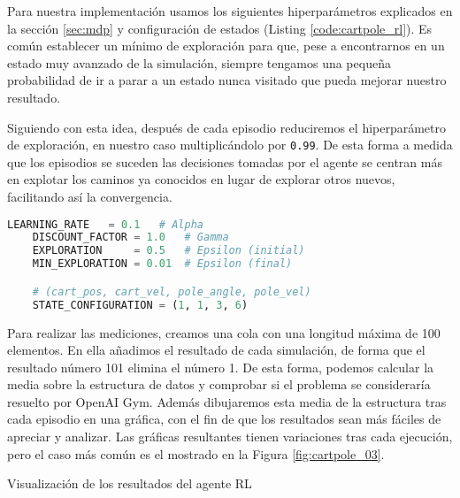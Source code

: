 Para nuestra implementación usamos los siguientes hiperparámetros explicados en la sección \ref{sec:mdp} y configuración de estados (Listing \ref{code:cartpole_rl}). Es común establecer un mínimo de exploración para que, pese a encontrarnos en un estado muy avanzado de la simulación, siempre tengamos una pequeña probabilidad de ir a parar a un estado nunca visitado que pueda mejorar nuestro resultado.

Siguiendo con esta idea, después de cada episodio reduciremos el hiperparámetro de exploración, en nuestro caso multiplicándolo por \texttt{0.99}. De esta forma a medida que los episodios se suceden las decisiones tomadas por el agente se centran más en explotar los caminos ya conocidos en lugar de explorar otros nuevos, facilitando así la convergencia.

\begin{minipage}{0.9\linewidth}%
    \begin{lstlisting}[frame=tb, language=Python, caption=Hiperparámetros y configuración de estados, label=code:cartpole_rl]
    LEARNING_RATE   = 0.1   # Alpha
    DISCOUNT_FACTOR = 1.0   # Gamma
    EXPLORATION     = 0.5   # Epsilon (initial)
    MIN_EXPLORATION = 0.01  # Epsilon (final)

    # (cart_pos, cart_vel, pole_angle, pole_vel)
    STATE_CONFIGURATION = (1, 1, 3, 6)
    \end{lstlisting}%
\end{minipage}

Para realizar las mediciones, creamos una cola con una longitud máxima de 100 elementos. En ella añadimos el resultado de cada simulación, de forma que el resultado número 101 elimina el número 1. De esta forma, podemos calcular la media sobre la estructura de datos y comprobar si el problema se consideraría resuelto por OpenAI Gym. Además dibujaremos esta media de la estructura tras cada episodio en una gráfica, con el fin de que los resultados sean más fáciles de apreciar y analizar. Las gráficas resultantes tienen variaciones tras cada ejecución, pero el caso más común es el mostrado en la Figura \ref{fig:cartpole_03}.

%
       {Visualización de los resultados del agente RL}


